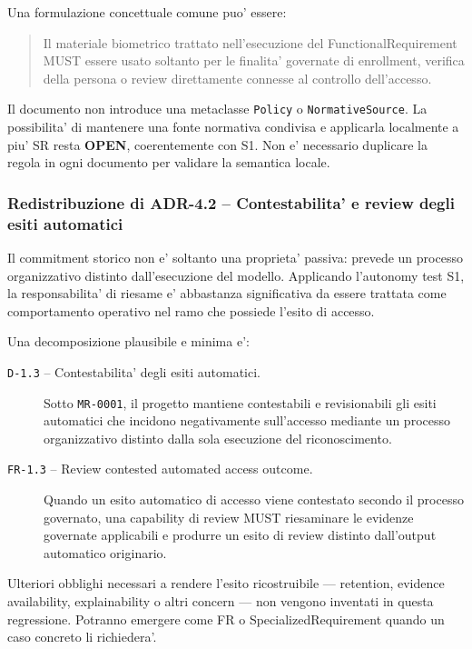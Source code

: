 \documentclass[11pt,a4paper]{article}
\newcommand{\openstatus}{\textbf{OPEN}}
\begin{document}
Una formulazione concettuale comune puo' essere:

\begin{quote}
Il materiale biometrico trattato nell'esecuzione del FunctionalRequirement MUST essere usato soltanto per le finalita' governate di enrollment, verifica della persona o review direttamente connesse al controllo dell'accesso.
\end{quote}

Il documento non introduce una metaclasse \texttt{Policy} o \texttt{NormativeSource}. La possibilita' di mantenere una fonte normativa condivisa e applicarla localmente a piu' SR resta \openstatus{}, coerentemente con S1. Non e' necessario duplicare la regola in ogni documento per validare la semantica locale.

\subsubsection{Redistribuzione di ADR-4.2 -- Contestabilita' e review degli esiti automatici}

Il commitment storico non e' soltanto una proprieta' passiva: prevede un processo organizzativo distinto dall'esecuzione del modello. Applicando l'autonomy test S1, la responsabilita' di riesame e' abbastanza significativa da essere trattata come comportamento operativo nel ramo che possiede l'esito di accesso.

Una decomposizione plausibile e minima e':

\begin{description}
  \item[\texttt{D-1.3} -- Contestabilita' degli esiti automatici.] Sotto \texttt{MR-0001}, il progetto mantiene contestabili e revisionabili gli esiti automatici che incidono negativamente sull'accesso mediante un processo organizzativo distinto dalla sola esecuzione del riconoscimento.
  \item[\texttt{FR-1.3} -- Review contested automated access outcome.] Quando un esito automatico di accesso viene contestato secondo il processo governato, una capability di review MUST riesaminare le evidenze governate applicabili e produrre un esito di review distinto dall'output automatico originario.
\end{description}

Ulteriori obblighi necessari a rendere l'esito ricostruibile --- retention, evidence availability, explainability o altri concern --- non vengono inventati in questa regressione. Potranno emergere come FR o SpecializedRequirement quando un caso concreto li richiedera'.
\end{document}
